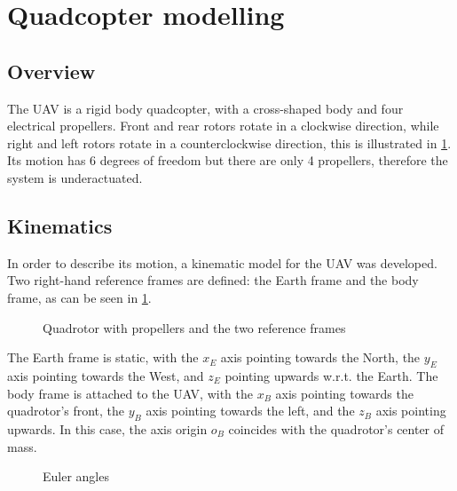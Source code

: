 \documentclass[journal]{IEEEtran}
\begin{document}
	\section{Quadcopter modelling}
	\subsection{Overview}
	
	The UAV is a rigid body quadcopter, with a cross-shaped body and four electrical propellers. Front and rear rotors rotate in a clockwise direction, while right and left rotors rotate in a counterclockwise direction, this is illustrated in \figurename \ref{fig:frames_rotors}. Its motion has 6 degrees of freedom but there are only 4 propellers, therefore the system is underactuated. 
	
	\subsection{Kinematics}
	In order to describe its motion, a kinematic model for the UAV was developed.
	Two right-hand reference frames are defined: the Earth frame and the body frame, as can be seen in \figurename{\ref{fig:frames_rotors}}. 
	
	\begin{figure}[h]
		\centering
		
		\caption{Quadrotor with propellers and the two reference frames}
		\label{fig:frames_rotors}
	\end{figure}
	
	The Earth frame is static, with the $x_E$ axis pointing towards the North, the $y_E$ axis pointing towards the West, and $z_E$ pointing upwards w.r.t. the Earth. The body frame is attached to the UAV, with the $x_B$ axis pointing towards the quadrotor's front, the $y_B$ axis pointing towards the left, and the $z_B$ axis pointing upwards. In this case, the axis origin $o_B$ coincides with the quadrotor's center of mass.
	
	\begin{figure}[h]
		\centering
		
		
		
		\caption{Euler angles}
		\label{fig:roll_pitch_yaw}
	\end{figure}
	
\end{document}
